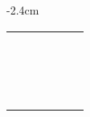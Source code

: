 \begin{center}
\begin{adjustwidth}{-2.4cm}{}
\begin{tabular}{|c c c c c c|}
             &  &  &  &  &  \\
             &  &  &  &  &  \\
             &  &  &  &  &  \\
             &  &  &  &  &  \\
             &  &  &  &  &  \\
             &  &  &  &  &  \\
             &  &  &  &  &  \\
             &  &  &  &  &  \\
             &  &  &  &  &  \\
             &  &  &  &  &  \\
             &  &  &  &  &  \\
             &  &  &  &  &  \\
             &  &  &  &  &  \\
             &  &  &  &  &  \\
             &  &  &  &  &  \\
             &  &  &  &  &  \\
            \hline
        \end{tabular}
    \end{adjustwidth}
\end{center}

